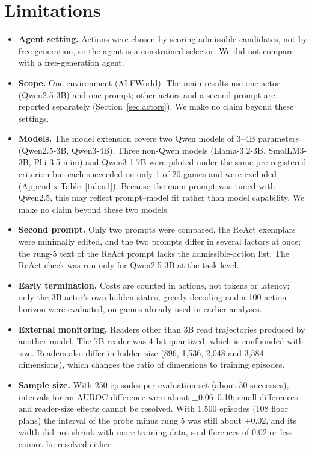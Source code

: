 \documentclass[11pt]{article}
\begin{document}
\section{Limitations}\label{sec:limits}
\begin{itemize}
\item \textbf{Agent setting.} Actions were chosen by scoring admissible candidates, not by free generation, so the agent is a constrained selector. We did not compare with a free-generation agent.
\item \textbf{Scope.} One environment (ALFWorld). The main results use one actor (Qwen2.5-3B) and one prompt; other actors and a second prompt are reported separately (Section~\ref{sec:actors}). We make no claim beyond these settings.
\item \textbf{Models.} The model extension covers two Qwen models of 3--4B parameters (Qwen2.5-3B, Qwen3-4B). Three non-Qwen models (Llama-3.2-3B, SmolLM3-3B, Phi-3.5-mini) and Qwen3-1.7B were piloted under the same pre-registered criterion but each succeeded on only 1 of 20 games and were excluded (Appendix Table~\ref{tab:a1}). Because the main prompt was tuned with Qwen2.5, this may reflect prompt--model fit rather than model capability. We make no claim beyond these two models.
\item \textbf{Second prompt.} Only two prompts were compared, the ReAct exemplars were minimally edited, and the two prompts differ in several factors at once; the rung-5 text of the ReAct prompt lacks the admissible-action list. The ReAct check was run only for Qwen2.5-3B at the task level.
\item \textbf{Early termination.} Costs are counted in actions, not tokens or latency; only the 3B actor's own hidden states, greedy decoding and a 100-action horizon were evaluated, on games already used in earlier analyses.
\item \textbf{External monitoring.} Readers other than 3B read trajectories produced by another model. The 7B reader was 4-bit quantized, which is confounded with size. Readers also differ in hidden size (896, 1,536, 2,048 and 3,584 dimensions), which changes the ratio of dimensions to training episodes.
\item \textbf{Sample size.} With 250 episodes per evaluation set (about 50 successes), intervals for an AUROC difference were about $\pm$0.06--0.10; small differences and reader-size effects cannot be resolved. With 1,500 episodes (108 floor plans) the interval of the probe minus rung 5 was still about $\pm$0.02, and its width did not shrink with more training data, so differences of 0.02 or less cannot be resolved either.

\end{itemize}
\end{document}
